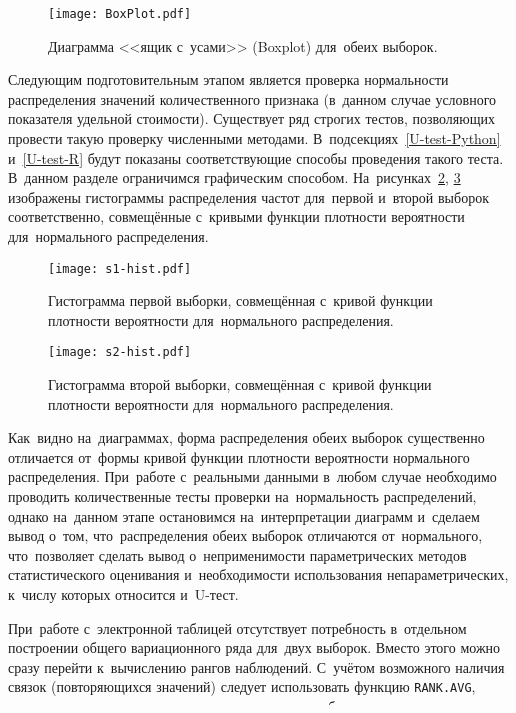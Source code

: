 \documentclass[]{scrreprt}
\begin{document}
%
\begin{figure}[ht]
	\centering
	\texttt{[image: BoxPlot.pdf]}
	\caption{Диаграмма <<ящик с~усами>> (Boxplot) для~обеих выборок.}
	\label{fig:BoxPlot}
\end{figure}
%
Следующим подготовительным этапом является проверка нормальности распределения значений количественного признака (в~данном случае условного показателя удельной стоимости). Существует ряд строгих тестов, позволяющих провести такую проверку численными методами. В~подсекциях~\ref{U-test-Python} и~\ref{U-test-R} будут показаны соответствующие способы проведения такого теста. В~данном разделе ограничимся графическим способом. На~рисунках~\ref{fig:s1-hist}, \ref{fig:s2-hist} изображены гистограммы распределения частот для~первой и~второй выборок соответственно, совмещённые с~кривыми функции плотности вероятности для~нормального распределения.
%
\begin{figure}[ht]
	\centering
	\texttt{[image: s1-hist.pdf]}
	\caption{Гистограмма первой выборки, совмещённая с~кривой функции плотности вероятности для~нормального распределения.}
	\label{fig:s1-hist}
\end{figure}
%
\begin{figure}[ht]
	\centering
	\texttt{[image: s2-hist.pdf]}
	\caption{Гистограмма второй выборки, совмещённая с~кривой функции плотности вероятности для~нормального распределения.}
	\label{fig:s2-hist}
\end{figure}
%

Как~видно на~диаграммах, форма распределения обеих выборок существенно отличается от~формы кривой функции плотности вероятности нормального распределения. При~работе с~реальными данными в~любом случае необходимо проводить количественные тесты проверки на~нормальность распределений, однако на~данном этапе остановимся на~интерпретации диаграмм и~сделаем вывод о~том, что~распределения обеих выборок отличаются от~нормального, что~позволяет сделать вывод о~неприменимости параметрических методов статистического оценивания и~необходимости использования непараметрических, к~числу которых относится и~U-тест.

При~работе с~электронной таблицей отсутствует потребность в~отдельном построении общего вариационного ряда для~двух выборок. Вместо этого можно сразу перейти к~вычислению рангов наблюдений. С~учётом возможного наличия связок (повторяющихся значений) следует использовать функцию \texttt{RANK.AVG}, последовательно указав при~этом три~аргумента: наблюдение, для~которого вычисляется ранг, диапазон всех значений общего вариационного ряда, тип сортировки: 0 "--- по~убыванию, 1 "--- по~возрастанию, в~нашем случае необходимо указать~1. Столбцы L, N содержат дублирующие значения, столбцы M и~O "--- ранги соответствующих наблюдений. 
\end{document}

